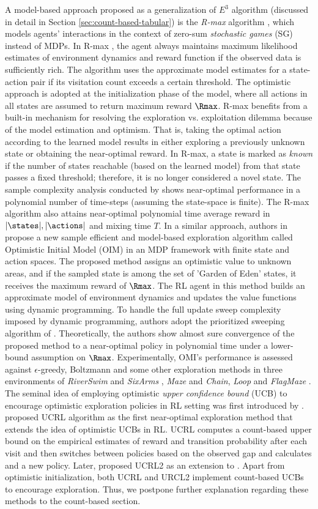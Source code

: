 \label{sec:optim-tab}
A model-based approach proposed as a generalization of $E^3$ algorithm  (discussed in detail in Section \ref{sec:count-based-tabular}) is the \textit{R-max} algorithm , which models agents' interactions in the context of zero-sum \textit{stochastic games} (SG) instead of MDPs. In R-max , the agent always maintains maximum likelihood estimates of environment dynamics and reward function if the observed data is sufficiently rich. The algorithm uses the approximate model estimates for a state-action pair if its visitation count exceeds a certain threshold. The optimistic approach is adopted at the initialization phase of the model, where all actions in all states are assumed to return maximum reward $\Rmax$. R-max benefits from a built-in mechanism for resolving the exploration vs. exploitation dilemma because of the model estimation and optimism. That is, taking the optimal action according to the learned model results in either exploring a previously unknown state or obtaining the near-optimal reward. In R-max, a state is marked as \textit{known} if the number of states reachable (based on the learned model) from that state passes a fixed threshold; therefore, it is no longer considered a novel state. The sample complexity analysis conducted by  shows near-optimal performance in a polynomial number of time-steps (assuming the state-space is finite). The R-max algorithm also attains near-optimal polynomial time average reward in $|\states|, |\actions|$ and mixing time $T$. 
In a similar approach, authors in  propose a new sample efficient and model-based exploration algorithm called Optimistic Initial Model (OIM) in an MDP framework with finite state and action spaces. The proposed method assigns an optimistic value to unknown areas, and if the sampled state is among the set of 'Garden of Eden' states, it receives the maximum reward of $\Rmax$. The RL agent in this method builds an approximate model of environment dynamics and updates the value functions using dynamic programming. To handle the full update sweep complexity imposed by dynamic programming, authors adopt the prioritized sweeping algorithm of . Theoretically, the authors show almost sure convergence of the proposed method to a near-optimal policy in polynomial time under a lower-bound assumption on $\Rmax$. Experimentally, OMI's performance is assessed against $\epsilon$-greedy, Boltzmann and some other exploration methods in three environments of \textit{RiverSwim} and \textit{SixArms} , \textit{Maze}  and \textit{Chain}, \textit{Loop} and \textit{FlagMaze} .
The seminal idea of employing optimistic \textit{upper confidence bound} (UCB) to encourage optimistic exploration policies in RL setting was first introduced by .  proposed UCRL algorithm as the first near-optimal exploration method that extends the idea of optimistic UCBs in RL. UCRL computes a count-based upper bound on the empirical estimates of reward and transition probability after each visit and then switches between policies based on the observed gap and calculates and a new policy. Later,  proposed UCRL2 as an extension to . Apart from optimistic initialization, both UCRL and URCL2 implement count-based UCBs to encourage exploration. Thus, we postpone further explanation regarding these methods to the count-based section.

